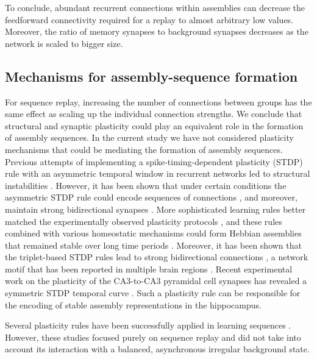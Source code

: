     To conclude, abundant recurrent connections within assemblies can decrease
    the feedforward connectivity required for a replay to almost arbitrary low
    values. Moreover, the ratio of memory synapses to background synapses
    decreases as the network is scaled to bigger size.

  \subsection{Mechanisms for assembly-sequence formation}
    For sequence replay, increasing the number of connections between groups
    has the same effect as scaling up the individual connection strengths. We
    conclude that structural and synaptic plasticity could play an equivalent
    role in the formation of assembly sequences. In the current study we have
    not considered plasticity mechanisms that could be mediating the formation
    of assembly sequences. Previous attempts of implementing a
    spike-timing-dependent plasticity (STDP) rule with an asymmetric temporal
    window \citep{Bi1998, Gerstner1996, Kempter1999} in recurrent networks led to
    structural instabilities \citep{Horn2000, Morrison2007, Lazar2009}. However,
    it has been shown that under certain conditions the asymmetric STDP rule
    could encode sequences of connections \citep{Jahnke2015}, and moreover,
    maintain strong bidirectional synapses \citep{Bush2010}. More sophisticated
    learning rules better matched the experimentally observed plasticity
    protocols \citep{Pfister2006, Clopath2010, Graupner2012}, and these rules
    combined with various homeostatic mechanisms could form Hebbian assemblies
    that remained stable over long time periods \citep{Litwin2014,
    Sadeh2015, Zenke2015}. Moreover, it has been shown that the triplet-based
    STDP rules \citep{Pfister2006, Clopath2010} lead to strong bidirectional
    connections \citep{Litwin2014, Sadeh2015}, a network motif that has
    been reported in multiple brain regions \citep{Song2005, Ko2011,
    Sadovsky2013, Cossell2015, Guzman2016}. Recent experimental work on the
    plasticity of the CA3-to-CA3 pyramidal cell synapses has revealed a
    symmetric STDP temporal curve \citep{Mishra2016}. Such a plasticity rule can
    be responsible for the encoding of stable assembly representations in the
    hippocampus.

    Several plasticity rules have been successfully applied in learning
    sequences \citep{Bush2010, Waddington2012, Brea2013, Kruskal2013,
    Rezende2014, Scarpetta2015, Jahnke2015}. However, these studies focused
    purely on sequence replay and did not take into account its interaction
    with a balanced, asynchronous irregular background state.

